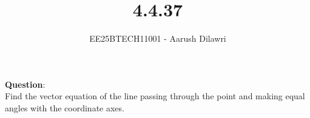 \documentclass[journal]{IEEEtran}
\begin{document}

\vspace{3cm}

\title{4.4.37}
\author{EE25BTECH11001 - Aarush Dilawri}
\maketitle
{\let\newpage\relax\maketitle}

\renewcommand{\thefigure}{\theenumi}
\renewcommand{\thetable}{\theenumi}
\setlength{\intextsep}{10pt} %


\renewcommand{\thetable}{\theenumi}

\textbf{Question}:\\
Find the vector equation of the line passing through the point  and making equal angles with the coordinate axes.

\solution \\
\end{document}
